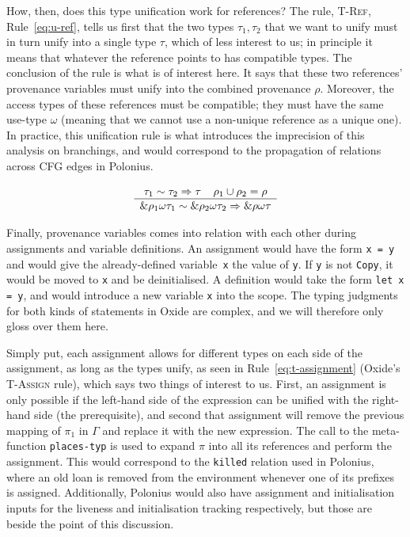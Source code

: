 \documentclass[11pt,a4paper,twoside,openany]{report}
\newcommand{\InRust}[1]{\texttt{#1}}
\newcommand{\InDatalog}[1]{\texttt{#1}}
\newcommand{\ntyperule}[2]{\begin{array}{c}#1\\\hline\raisebox{1pt}{\strut}#2\end{array}}
\begin{document}
How, then, does this type unification work for references? The rule,
\textsc{T-Ref}, Rule~\eqref{eq:u-ref}, tells us first that the two types
$\tau_1, \tau_2$ that we want to unify must in turn unify into a single type
$\tau$, which of less interest to us; in principle it means that whatever the
reference points to has compatible types. The conclusion of the rule is what is
of interest here. It says that these two references' provenance variables must
unify into the combined provenance $\rho$. Moreover, the access types of these
references must be compatible; they must have the same use-type $\omega$
(meaning that we cannot use a non-unique reference as a unique one). In
practice, this unification rule is what introduces the imprecision of this
analysis on branchings, and would correspond to the propagation of relations
across CFG edges in Polonius.

\begin{equation}\label{eq:u-ref}
  \ntyperule{
    \tau_1 \sim \tau_2 \Rightarrow \tau \:\:\:\:\: \rho_1 \cup \rho_2 = \rho}
  {
    \&\rho_1 \omega \tau_1 \sim \& \rho_2  \omega \tau_2 \Rightarrow \&\rho \omega \tau
  }
\end{equation}

Finally, provenance variables comes into relation with each other during
assignments and variable definitions. An assignment would have the form
\InRust{x = y} and would give the already-defined variable~\InRust{x} the value
of \InRust{y}. If \InRust{y} is not \InRust{Copy}, it would be moved to
\InRust{x} and be deinitialised. A definition would take the form \InRust{let x
  = y}, and would introduce a new variable \InRust{x} into the scope. The typing
judgments for both kinds of statements in Oxide are complex, and we will
therefore only gloss over them here.

Simply put, each assignment allows for different types on each side of the
assignment, as long as the types unify, as seen in Rule~\eqref{eq:t-assignment}
(Oxide's \textsc{T-Assign} rule), which says two things of interest to us.
First, an assignment is only possible if the left-hand side of the expression
can be unified with the right-hand side (the prerequisite), and second that
assignment will remove the previous mapping of $\pi_1$ in $\Gamma$ and replace
it with the new expression. The call to the meta-function \texttt{places-typ} is
used to expand $\pi$ into all its references and perform the assignment. This
would correspond to the \InDatalog{killed} relation used in Polonius, where an
old loan is removed from the environment whenever one of its prefixes is
assigned. Additionally, Polonius would also have assignment and initialisation
inputs for the liveness and initialisation tracking respectively, but those are
beside the point of this discussion.
\end{document}
